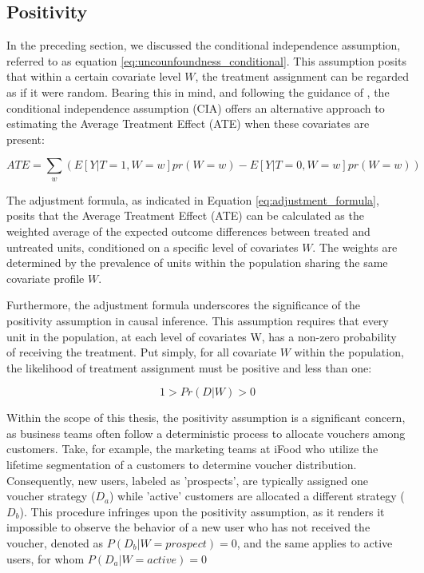\subsection{Positivity}
\label{sub:positivity}
In the preceding section, we discussed the conditional independence assumption, referred to as equation \ref{eq:uncounfoundness_conditional}. This assumption posits that within a certain covariate level 
$W$, the treatment assignment can be regarded as if it were random. Bearing this in mind, and following the guidance of \textcite{facure_causal_2023}, the conditional independence assumption (CIA) offers an alternative approach to estimating the Average Treatment Effect (\gls{ATE})
when these covariates are present:

\begin{equation}
ATE = \sum_{w} \left( E[Y|T=1, W=w] pr(W=w) - E[Y|T=0, W=w] pr(W=w) \right)
\label{eq:adjustment_formula}
\end{equation}

The adjustment formula, as indicated in Equation \ref{eq:adjustment_formula}, posits that the Average Treatment Effect (\gls{ATE}) can be calculated as the weighted average of the expected outcome differences between treated and untreated units, conditioned on a specific level of covariates 
$W$. The weights are determined by the prevalence of units within the population sharing the same covariate profile $W$.

Furthermore, the adjustment formula underscores the significance of the positivity assumption in causal inference. This assumption requires that every unit in the population, at each level of covariates  W, has a non-zero probability of receiving the treatment. Put simply, for all covariate 
$W$ within the population, the likelihood of treatment assignment must be positive and less than one:

\begin{equation}
  1 > Pr(D | W ) > 0
  \label{eq:positivity}
\end{equation}

Within the scope of this thesis, the positivity assumption is a significant concern, as business teams often follow a deterministic process to allocate vouchers among customers. Take, for example, the marketing teams at iFood who utilize the lifetime segmentation of a customers
to determine voucher distribution. Consequently, new users, labeled as 'prospects', are typically assigned one voucher strategy ($D_a$) while 'active' customers are allocated a different strategy ($D_b$). This procedure infringes upon the positivity assumption, as it renders it
impossible to observe the behavior of a new user who has not received the voucher, denoted as $P(D_b | W = prospect) = 0$, and the same applies to active users, for whom $P(D_a | W = active) = 0$

